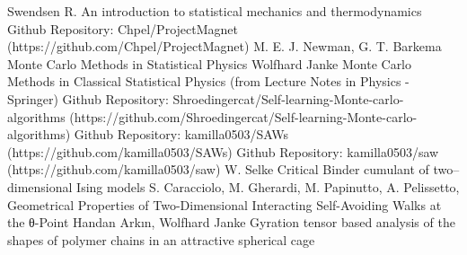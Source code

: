 \begin{thebibliography}{9}
 Swendsen R. An introduction to statistical mechanics and thermodynamics
 Github Repository: Chpel/ProjectMagnet (https://github.com/Chpel/ProjectMagnet)
 M. E. J. Newman, G. T. Barkema Monte Carlo Methods in Statistical Physics
 Wolfhard Janke Monte Carlo Methods in Classical Statistical Physics (from Lecture Notes in Physics - Springer)
 Github Repository: Shroedingercat/Self-learning-Monte-carlo-algorithms (https://github.com/Shroedingercat/Self-learning-Monte-carlo-algorithms)
 Github Repository: kamilla0503/SAWs (https://github.com/kamilla0503/SAWs)
 Github Repository: kamilla0503/saw (https://github.com/kamilla0503/saw)
 W. Selke Critical Binder cumulant of two–dimensional Ising models
 S. Caracciolo, M. Gherardi, M. Papinutto, A. Pelissetto, Geometrical Properties of Two-Dimensional
Interacting Self-Avoiding Walks at the θ-Point
 Handan Arkın, Wolfhard Janke Gyration tensor based analysis of the shapes of polymer chains in an
attractive spherical cage

\end{thebibliography}